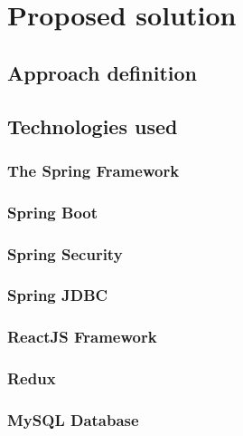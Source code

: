 \chapter{Proposed solution}
\label{chapter:proposedSolution}

\section{Approach definition}
\label{section:approachDefinition}


\section{Technologies used}
\label{section:technologiesUsed}


\subsection{The Spring Framework}
\label{subsection:springBootFramework}

\subsection{Spring Boot}
\label{subsection:springBoot}

\subsection{Spring Security}
\label{subsection:proposedSolution}

\subsection{Spring JDBC}
\label{subsection:springJDBC}

\subsection{ReactJS Framework}
\label{section:reactJSFramework}

\subsection{Redux}
\label{section:redux}

\subsection{MySQL Database}
\label{section:mysqlDatabase}

